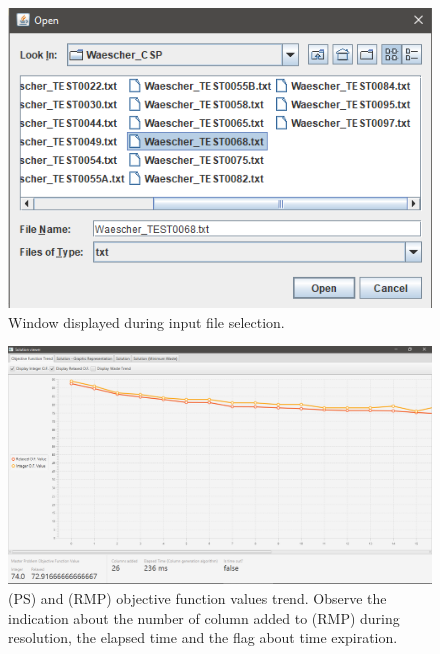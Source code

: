 \documentclass[10pt,a4paper]{article}
\begin{document}
\begin{figure}[H]
\includegraphics[width=\textwidth]{./images/fileopne.png}
\centering
\caption{Window displayed during input file selection.}

\end{figure}


\begin{figure}[H]
\includegraphics[width=\textwidth]{./images/main.png}
\centering
\caption{(PS) and (RMP) objective function values trend. Observe the indication about the number of column added to (RMP) during resolution, the elapsed time and the flag about time expiration.}

\end{figure}
\end{document}
